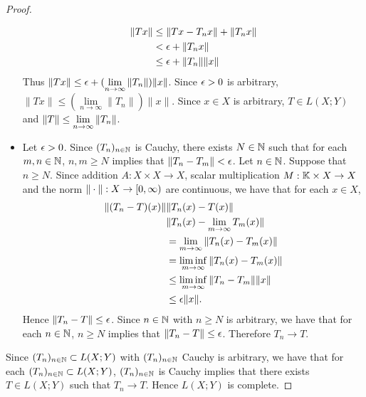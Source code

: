 \documentclass{book}
\begin{document}
\begin{proof}
\begin{itemize}
			\begin{align*}
				\|Tx\|
				&\leq \|Tx-T_nx \|+ \|T_nx \|\\
				&< \epsilon + \|T_nx \|\\
				&\leq \epsilon + \|T_n \|\|x \|
			\end{align*}  
			Thus $\|Tx \|\leq \epsilon +(\lim\limits_{n \rightarrow \infty} \|T_n \|) \|x \|$. Since $\epsilon >0$ is arbitrary, $\|Tx \|\leq (\lim\limits_{n \rightarrow \infty} \|T_n \|) \|x \|$. Since $x \in X$ is arbitrary, $T \in L(X; Y)$ and $\|T \|\leq \lim \limits_{n \rightarrow \infty} \|T_n \|$.
			\item Let $\epsilon >0 $. Since $(T_n)_{n \in \mathbb{N}}$ is Cauchy, there exists $N \in \mathbb{N}$ such that for each $m, n \in \mathbb{N}$, $n,m \geq N$ implies that $\|T_n - T_m\| < \epsilon$. Let $n \in \mathbb{N}$. Suppose that $n \geq N$. Since addition $A:X \times X \rightarrow X$, scalar multiplication $M:\mathbb{K} \times X \rightarrow X$ and the norm $\|\cdot\|:X \rightarrow [0,\infty)$ are continuous, we have that for each $x \in X$, 
			\begin{align*}
				\|(T_n - T)(x)\|
				& \|T_n(x) - T(x)\| \\
				& \|T_n(x) - \lim_{m \rightarrow \infty} T_m(x)\| \\
				& = \lim_{m \rightarrow \infty} \|T_n(x) - T_m(x)\| \\
				& = \liminf_{m \rightarrow \infty} \|T_n(x) - T_m(x)\| \\
				& \leq \liminf_{m \rightarrow \infty} \|T_n - T_m\| \|x\| \\
				& \leq \epsilon \|x\|.
			\end{align*}
			Hence $\|T_n -T\| \leq \epsilon$. Since $n \in \mathbb{N}$ with $n \geq N$ is arbitrary, we have that for each $n \in \mathbb{N}$, $n \geq N$ implies that $\|T_n -T\| \leq \epsilon$. Therefore $T_n \rightarrow T$. 
		\end{itemize}
	 Since $(T_n)_{n \in \mathbb{N}} \subset L(X; Y)$ with $(T_n)_{n \in \mathbb{N}}$ Cauchy is arbitrary, we have that for each $(T_n)_{n \in \mathbb{N}} \subset L(X; Y)$, $(T_n)_{n \in \mathbb{N}}$ is Cauchy implies that there exists $T \in L(X;Y)$ such that $T_n \rightarrow T$. Hence $L(X;Y)$ is complete.
	\end{proof}
	
	
	
	
	
	
	
	
	
	
	
	
	
	
	
	
	
	
	
\end{document}

